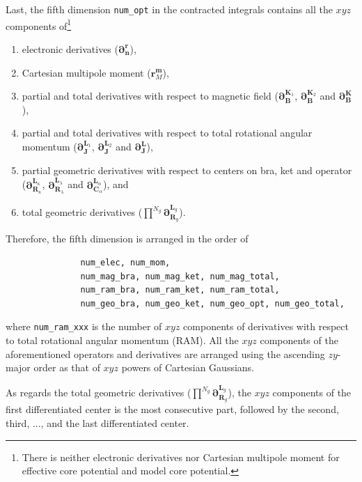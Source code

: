 \documentclass[a4paper,11pt,twoside,openright]{book}
\begin{document}
Last, the fifth dimension \verb|num_opt| in the contracted integrals contains all the
$xyz$ components of\footnote{There is neither electronic derivatives nor Cartesian
multipole moment for effective core potential and model core potential.}
\begin{enumerate}
  \item electronic derivatives ($\boldsymbol{\partial}_{\boldsymbol{n}}^{\boldsymbol{r}}$),
  \item Cartesian multipole moment ($\boldsymbol{r}_{M}^{\boldsymbol{m}}$),
  \item partial and total derivatives with respect to magnetic field
    ($\boldsymbol{\partial}_{\boldsymbol{B}}^{\boldsymbol{K}_{1}}$,
    $\boldsymbol{\partial}_{\boldsymbol{B}}^{\boldsymbol{K}_{2}}$ and
    $\boldsymbol{\partial}_{\boldsymbol{B}}^{\boldsymbol{K}}$),
  \item partial and total derivatives with respect to total rotational angular momentum
    ($\boldsymbol{\partial}_{\boldsymbol{J}}^{\boldsymbol{L}_{1}}$,
    $\boldsymbol{\partial}_{\boldsymbol{J}}^{\boldsymbol{L}_{2}}$ and
    $\boldsymbol{\partial}_{\boldsymbol{J}}^{\boldsymbol{L}}$),
  \item partial geometric derivatives with respect to centers on bra, ket and operator
    ($\boldsymbol{\partial}_{\boldsymbol{R}_{\kappa}}^{\boldsymbol{L}_{\kappa}}$,
    $\boldsymbol{\partial}_{\boldsymbol{R}_{\lambda}}^{\boldsymbol{L}_{\lambda}}$
    and $\boldsymbol{\partial}_{\boldsymbol{C}_{\alpha}}^{\boldsymbol{L}_{\alpha}}$),
    and
  \item total geometric derivatives ($\prod^{N_{g}}\boldsymbol{\partial}_{\boldsymbol{R}_{g}}^{\boldsymbol{L}_{g}}$).
\end{enumerate}
Therefore, the fifth dimension is arranged in the order of
\begin{verbatim}
               num_elec, num_mom,
               num_mag_bra, num_mag_ket, num_mag_total,
               num_ram_bra, num_ram_ket, num_ram_total,
               num_geo_bra, num_geo_ket, num_geo_opt, num_geo_total,
\end{verbatim}
where \verb|num_ram_xxx| is the number of $xyz$ components of derivatives with
respect to total rotational angular momentum (RAM). All the $xyz$ components of
the aforementioned operators and derivatives are arranged using the ascending
$zy$-major order as that of $xyz$ powers of Cartesian Gaussians.

As regards the total geometric derivatives ($\prod^{N_{g}}\boldsymbol{\partial}_{\boldsymbol{R}_{g}}^{\boldsymbol{L}_{g}}$),
the $xyz$ components of the first differentiated center is the most consecutive part,
followed by the second, third, ..., and the last differentiated center.
\end{document}
